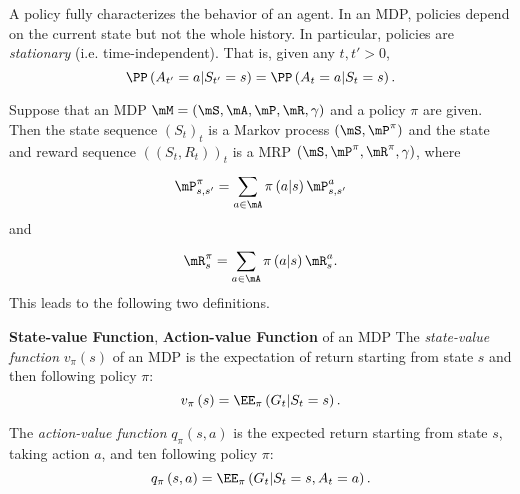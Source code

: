 \documentclass[RL]{subfiles}
\begin{document}
    \np A policy fully characterizes the behavior of an agent. In an MDP, policies depend on the current state but not the whole history. In particular, policies are \textit{stationary} (i.e. time-independent). That is, given any $t,t'>0$,
    \begin{equation*}
        \PP\left( A_{t'}=a|S_{t'}=s \right) = \PP\left( A_t=a|S_t=s \right).
    \end{equation*}

    \np Suppose that an MDP $\mM = \left( \mS,\mA,\mP,\mR,\gamma \right)$ and a policy $\pi$ are given. Then the state sequence $\left( S_{t} \right)^{}_{t}$ is a Markov process $\left( \mS,\mP^{\pi} \right)$ and the state and reward sequence $\left( \left( S_t,R_t \right) \right)_t$ is a MRP $\left( \mS,\mP^{\pi},\mR^{\pi},\gamma \right)$, where
    \begin{equation*}
        \mP^{\pi}_{s,s'} = \sum^{}_{a\in\mA} \pi\left( a|s \right)\mP^a_{s,s'}
    \end{equation*}
    and
    \begin{equation*}
        \mR^{\pi}_s = \sum^{}_{a\in\mA} \pi\left( a|s \right)\mR^a_s.
    \end{equation*}
    This leads to the following two definitions.

    \begin{definition}{\textbf{State-value Function}, \textbf{Action-value Function} of an MDP}
        The \emph{state-value function} $v_{\pi}\left( s \right)$ of an MDP is the expectation of return starting from state $s$ and then following policy $\pi$:
        \begin{equation*}
            v_{\pi}\left( s \right) = \EE_{\pi}\left( G_t|S_t=s \right).
        \end{equation*}

        The \emph{action-value function} $q_{\pi}\left( s,a \right)$ is the expected return starting from state $s$, taking action $a$, and ten following policy $\pi$:
        \begin{equation*}
            q_{\pi}\left( s,a \right) = \EE_{\pi}\left( G_t|S_t=s, A_t=a \right).
        \end{equation*}
    \end{definition}
\end{document}
